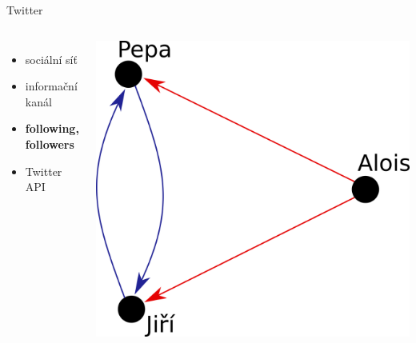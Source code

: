 \documentclass[notheorems,12pt]{beamer}
\begin{document}
\begin{frame}{Twitter}
    \begin{columns}
    \column{5cm}
    	\begin{itemize}
    		\item sociální síť
    		\item informační kanál
            \item \textbf{following, followers}
    		\item Twitter API
    	\end{itemize}
    \column{6cm}
    	\center
    	\includegraphics[scale=0.35]{./Pics/deeper_pics/pepa.png}
    \end{columns}
\end{frame}
\end{document}
